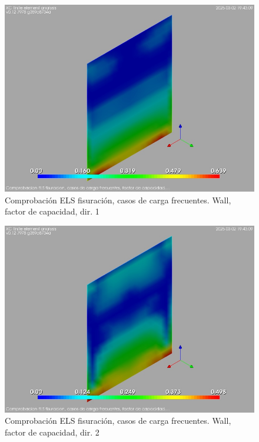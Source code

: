 \begin{figure}[ht]
\begin{center}
\includegraphics[width=\linewidth]{results/graphics/crackingSLS_freq/wallCFSect1}
\caption{Comprobación ELS fisuración, casos de carga frecuentes. Wall, factor de capacidad, dir. 1}
\label{SLS_frequentLoadsCrackControlwallCFSect1}
\end{center}
\end{figure}
\begin{figure}[ht]
\begin{center}
\includegraphics[width=\linewidth]{results/graphics/crackingSLS_freq/wallCFSect2}
\caption{Comprobación ELS fisuración, casos de carga frecuentes. Wall, factor de capacidad, dir. 2}
\label{SLS_frequentLoadsCrackControlwallCFSect2}
\end{center}
\end{figure}
